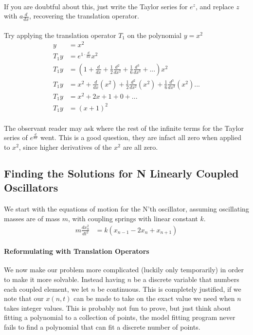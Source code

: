 \documentclass{article}
\begin{document}
	\paragraph{}
	If you are doubtful about this, just write the Taylor series for $e^{z}$, and replace $z$ with $a\frac{d}{dx}$, recovering the translation operator.
	\paragraph{}
	Try applying the translation operator $T_{1}$ on the polynomial $y = x^{2}$
	\begin{align}
		y &= x^{2}\\
		T_{1}y &= e^{1 \cdot \frac{d}{dx}}x^{2}\\
		T_{1}y &= (1 + \frac{d}{dx} + \frac{1}{2}\frac{d^{2}}{dx^{2}} + \frac{1}{6}\frac{d^{3}}{dx^{3}} + ...)x^{2}\\
		T_{1}y &= x^{2} + \frac{d}{dx}(x^{2}) + \frac{1}{2}\frac{d^{2}}{dx^{2}}(x^{2})  + \frac{1}{6}\frac{d^{3}}{dx^{3}}(x^{2})  ...\\
		T_{1}y &= x^{2} + 2x + 1 + 0 + ...\\
		T_{1}y &= (x + 1)^{2}
	\end{align}
	\paragraph{}
	The observant reader may ask where the rest of the infinite terms for the Taylor series of $e^{\frac{d}{dx}}$ went. This is a good question, they are infact all zero when applied to $x^{2}$, since higher derivatives of the $x^{2}$ are all zero.
	\subsection{Finding the Solutions for N Linearly Coupled Oscillators}

	\paragraph{}
		We start with the equations of motion for the N'th oscillator, assuming oscillating masses are of mass $m$, with coupling springs with linear constant $k$.
	\begin{align}
		m\frac{dx_{n}^{2}}{dt^{2}} &= k(x_{n - 1} - 2x_{n} + x_{n + 1})	
	\end{align}

	\paragraph{Reformulating with Translation Operators}
		We now make our problem more complicated (luckily only temporarily) in order to make it more solvable. Instead having $n$ be a discrete variable that numbers each coupled element, we let $n$ be continuous. This is completely justified, if we note that our $x(n,t)$ can be made to take on the exact value we need when $n$ takes integer values. This is probably not fun to prove, but just think about fitting a polynomial to a collection of points, the model fitting program never fails to find a polynomial that can fit a discrete number of points. 
\end{document}
